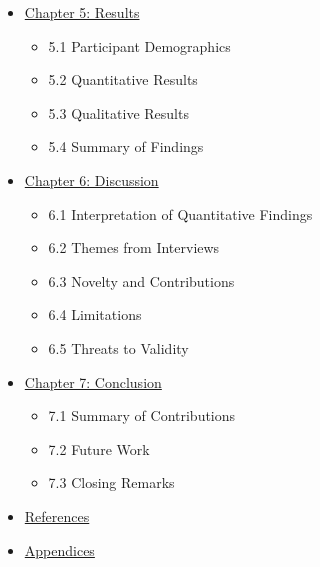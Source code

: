 \begin{itemize}
  \begin{itemize}
  \tightlist
  \item
    4.1 Technology Stack
  \item
    4.2 Backend Service
  \item
    4.3 Database Layer
  \item
    4.4 Player Modeling Implementation
  \item
    4.5 Narrative Pipeline Implementation
  \item
    4.6 RL Adaptation Implementation
  \item
    4.7 Unity Plugin Implementation
  \item
    4.8 Testing and Validation
  \end{itemize}
\item
  \hyperref[chapter-5-results]{Chapter 5: Results}

  \begin{itemize}
  \tightlist
  \item
    5.1 Participant Demographics
  \item
    5.2 Quantitative Results
  \item
    5.3 Qualitative Results
  \item
    5.4 Summary of Findings
  \end{itemize}
\item
  \hyperref[chapter-6-discussion]{Chapter 6: Discussion}

  \begin{itemize}
  \tightlist
  \item
    6.1 Interpretation of Quantitative Findings
  \item
    6.2 Themes from Interviews
  \item
    6.3 Novelty and Contributions
  \item
    6.4 Limitations
  \item
    6.5 Threats to Validity
  \end{itemize}
\item
  \hyperref[chapter-7-conclusion]{Chapter 7: Conclusion}

  \begin{itemize}
  \tightlist
  \item
    7.1 Summary of Contributions
  \item
    7.2 Future Work
  \item
    7.3 Closing Remarks
  \end{itemize}
\item
  \hyperref[references]{References}
\item
  \hyperref[appendices]{Appendices}
\end{itemize}

